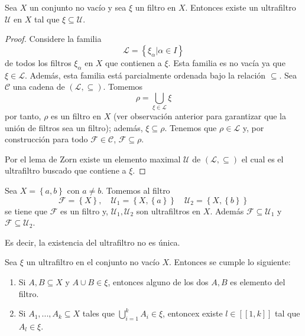 \documentclass[12pt]{report}
\theoremstyle{largebreak}
\newcommand{\natint}[1]{\ensuremath{\left[\!\left[#1\right]\!\right]}}
\begin{document}
    \begin{propo}
        Sea $X$ un conjunto no vacío y sea $\xi$ un filtro en $X$. Entonces existe un ultrafiltro $\mathcal{U}$ en $X$ tal que
        $\xi\subseteq\mathcal{U}$. 
    \end{propo}

    \begin{proof}
        Considere la familia
        \begin{equation*}
            \mathcal{L}=\left\{\xi_\alpha\Big|\alpha\in I \right\}
        \end{equation*}
        de todos los filtros $\xi_\alpha$ en $X$ que contienen a $\xi$. Esta familia es no vacía ya que $\xi\in\mathcal{L}$. Además, esta familia está parcialmente ordenada bajo la relación $\subseteq$. Sea $\mathcal{C}$ una cadena de $(\mathcal{L},\subseteq )$. Tomemos
        \begin{equation*}
            \rho=\bigcup_{\xi\in\mathcal{L}}\xi
        \end{equation*}
        por tanto, $\rho$ es un filtro en $X$ (ver observación anterior para garantizar que la unión de filtros sea un filtro); además, $\xi\subseteq\rho$. Tenemos que $\rho\in\mathcal{L}$ y, por construcción para todo $\mathcal{F}\in\mathcal{C}$, $\mathcal{F}\subseteq\rho$.

        Por el lema de Zorn existe un elemento maximal $\mathcal{U}$ de $(\mathcal{L},\subseteq )$ el cual es el ultrafiltro buscado que contiene a $\xi$.
    \end{proof}

    \begin{exa}
        Sea $X=\left\{a,b \right\}$ con $a\neq b$. Tomemos al filtro
        \begin{equation*}
            \mathcal{F}=\left\{X \right\},\quad\mathcal{U}_1=\left\{X,\left\{a\right\} \right\}\quad\mathcal{U}_2=\left\{X,\left\{b\right\} \right\}
        \end{equation*}
        se tiene que $\mathcal{F}$ es un filtro y, $\mathcal{U}_1,\mathcal{U}_2$ son ultrafiltros en $X$. Además $\mathcal{F}\subseteq\mathcal{U}_1$ y $\mathcal{F}\subseteq\mathcal{U}_2$.

        Es decir, la existencia del ultrafiltro no es única.
    \end{exa}

    \begin{propo}
        Sea $\xi$ un ultrafiltro en el conjunto no vacío $X$. Entonces se cumple lo siguiente:
        \begin{enumerate}
            \item Si $A,B\subseteq X$ y $A\cup B\in\xi$, entonces alguno de los dos $A,B$ es elemento del filtro.
            \item Si $A_1,...,A_k\subseteq X$ tales que $\bigcup_{ i=1}^k A_i\in\xi$, entoncex existe $l\in\natint{1,k}$ tal que $A_l\in\xi$.
        \end{enumerate}
    \end{propo}
\end{document}
